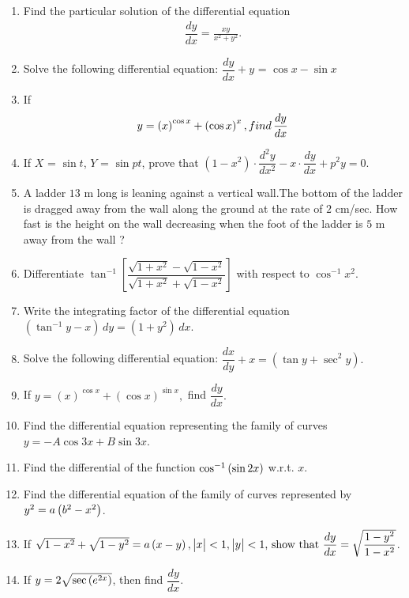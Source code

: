 \begin{enumerate}
\item Find the particular solution of the differential equation
  \begin{align*}
	\dfrac{dy}{dx}=\frac{xy}{x^2+y^2}.
  \end{align*}
\item Solve the following differential equation:
	$\dfrac{dy}{dx}+y$ = $\cos{x}-\sin{x}$
\item If
 \begin{align*}
    y= \left(x\right)^{\cos x} + \left(\cos x\right)^{x} , find \,\dfrac{dy}{dx}
     \end{align*}
\item If $X$ = $\sin t $, $Y$ = $\sin pt$, prove that $(1-x^2)\cdot \dfrac{d^2y}{dx^2}-x\cdot\dfrac{dy}{dx}+p^2y=0$.
\item A ladder $13$ m long is leaning against a vertical wall.The bottom of the ladder is dragged away from the wall along the ground at the rate of $2$ cm/sec. How fast is the height on the wall decreasing when the foot of the ladder is $5$ m away from the wall ?
\item Differentiate $ \tan^{-1}\left[\dfrac{\sqrt{1+x^{2}}-\sqrt{1-x^{2}}}{\sqrt{1+x^{2}}+\sqrt{1-x^{2}}}\right]$ with respect to $\cos^{-1}x^{2}$.
\item Write the integrating factor of the differential equation $(\tan^{-1} y-x)\,dy=(1+y^{2})\,dx$.
\item Solve the following differential equation: $\dfrac {dx}{dy}+x=(\tan y + \sec^{2} y).$
\item If $y=(x)^{\cos{x}}+{(\cos{x})}^{\sin{x}},$ find $\dfrac{dy}{dx}.$

\item Find the differential equation representing the family of curves $y=-A \cos 3x+B \sin 3x$.

\item Find the differential of the function $\cos^{-1}\left(\sin 2x\right)$ w.r.t. $x$.

\item Find the differential equation of the family of curves represented by ${y}^2 = a\left({b}^2 - {x}^2\right)$.
    
\item  If $\sqrt{1 - {x}^2} + \sqrt{1 - {y}^2} = a\left(x - y\right), \begin{vmatrix}x\end{vmatrix}<1, \begin{vmatrix}y\end{vmatrix}<1\text{, show that  }\dfrac{dy}{dx} = \sqrt{\dfrac{1 -{y}^2}{1 - {x}^2}}$.

\item If $y = 2\sqrt{\sec\left(e^{2x}\right)}$, then find $\dfrac{dy}{dx}$.


\end{enumerate}
